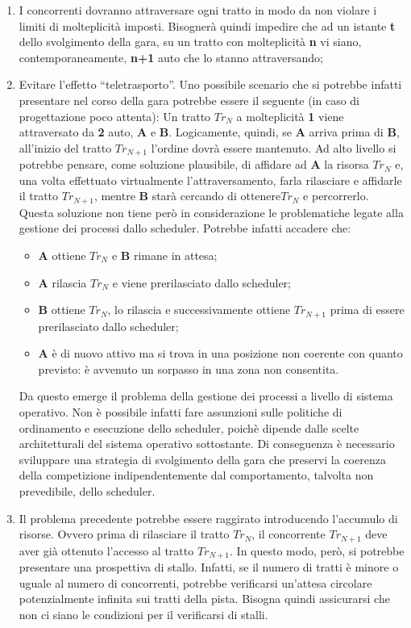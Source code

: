 \begin{enumerate}
\item I concorrenti dovranno attraversare ogni tratto in modo da non violare i limiti di molteplicit\`{a} imposti. Bisogner\`{a} quindi impedire che ad un istante \textbf{t} dello svolgimento della gara, su un tratto con molteplicit\`{a} \textbf{n} vi siano, contemporaneamente, \textbf{n+1} auto che lo stanno attraversando;
\item Evitare l'effetto ``teletrasporto''. Uno possibile scenario che si potrebbe infatti presentare nel corso della gara potrebbe 
essere il seguente (in caso di progettazione poco attenta):
Un tratto $Tr_N$ a molteplicit\`{a} \textbf{1} viene attraversato da \textbf{2} auto, \textbf{A} e \textbf{B}. Logicamente, 
quindi, se \textbf{A} arriva prima di \textbf{B}, all'inizio del tratto $Tr_{N+1}$ l'ordine dovr\`{a} essere mantenuto. 
Ad alto livello si potrebbe pensare, come soluzione plausibile, di affidare ad \textbf{A} la risorsa $Tr_N$ e, una 
volta effettuato virtualmente l'attraversamento, farla rilasciare e affidarle il tratto $Tr_{N+1}$, mentre \textbf{B} 
star\`{a} cercando di ottenere$Tr_N$ e percorrerlo.
Questa soluzione non tiene per\`{o} in considerazione le problematiche legate alla gestione dei processi dallo scheduler. 
Potrebbe infatti accadere che:
\begin{itemize}
\item \textbf{A} ottiene $Tr_N$ e \textbf{B} rimane in attesa;
\item \textbf{A} rilascia $Tr_N$ e viene prerilasciato dallo scheduler;
\item \textbf{B} ottiene $Tr_N$, lo rilascia e successivamente ottiene $Tr_{N+1}$ prima di essere prerilasciato 
dallo scheduler;
\item \textbf{A} \`{e} di nuovo attivo ma si trova in una posizione non coerente con quanto previsto: 
\`{e} avvenuto un sorpasso in una zona non consentita.
\end{itemize}
Da questo emerge il problema della gestione dei processi a livello di sistema operativo. 
Non \`{e} possibile infatti fare assunzioni sulle politiche di ordinamento e esecuzione dello scheduler, 
poich\`{e} dipende dalle scelte architetturali del sistema operativo sottostante. Di conseguenza \`{e} necessario 
sviluppare una strategia di svolgimento della gara che preservi la coerenza della competizione indipendentemente dal 
comportamento, talvolta non prevedibile, dello scheduler.
\item Il problema precedente potrebbe essere raggirato introducendo l'accumulo di risorse. Ovvero prima di rilasciare il tratto $Tr_N$, il concorrente $Tr_{N+1}$ deve aver gi\`{a} ottenuto l'accesso al tratto $Tr_{N+1}$. In questo modo, per\`{o}, si potrebbe presentare una prospettiva di stallo. Infatti, se il numero di tratti \`{e} minore o uguale al numero di concorrenti, potrebbe verificarsi un'attesa circolare potenzialmente infinita sui tratti della pista. Bisogna quindi assicurarsi che non ci siano le condizioni per il verificarsi di stalli.
\end{enumerate}
